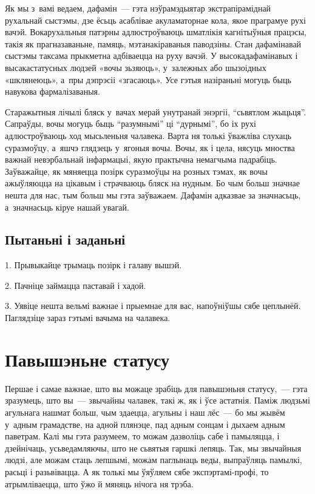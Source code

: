 Як мы з~вамі ведаем, дафамін~--- гэта нэўрамэдыятар экстрапіраміднай рухальнай сыстэмы, дзе ёсьць асаблівае акуламаторнае кола, якое праграмуе рухі вачэй. Вокарухальныя патэрны адлюстроўваюць шматлікія кагнітыўныя працэсы, такія як прагназаваньне, памяць, мэтанакіраваныя паводзіны. Стан дафамінавай сыстэмы таксама прыкметна адбіваецца на руху вачэй. У высокадафамінавых і высакастатусных людзей «вочы зьзяюць», у~залежных або шызоідных «шклянеюць», а~пры дэпрэсіі «згасаюць». Усе гэтыя назіраньні могуць быць навукова фармалізаваныя.

Старажытныя лічылі бляск у~вачах мерай унутранай энэргіі, ``сьвятлом жыцьця''. Сапраўды, вочы могуць быць ``разумнымі'' ці ``дурнымі'', бо іх рухі адлюстроўваюць ход мысьленьня чалавека. Варта ня толькі ўважліва слухаць суразмоўцу, а~яшчэ глядзець у~ягоныя вочы. Вочы, як і цела, нясуць мноства важнай невэрбальнай інфармацыі, якую практычна немагчыма падрабіць. Заўважайце, як мяняецца позірк суразмоўцы на розных тэмах, як вочы ажыўляюцца на цікавым і страчваюць бляск на нудным. Бо чым больш значнае нешта для нас, тым больш мы гэта заўважаем. Дафамін адказвае за значнасьць, а~значнасьць кіруе нашай увагай.

\subsection*{Пытаньні і заданьні}

1. Прывыкайце трымаць позірк і галаву вышэй.

2. Пачніце займацца паставай і хадой.

3. Уявіце нешта вельмі важнае і прыемнае для вас, напоўніўшы сябе цеплынёй. Паглядзіце зараз гэтымі вачыма на чалавека.


\section{Павышэньне статусу}

Першае і самае важнае, што вы можаце зрабіць для павышэньня статусу,~--- гэта зразумець, што вы~--- звычайны чалавек, такі ж, як і ўсе астатнія. Паміж людзьмі агульнага нашмат больш, чым здаецца, агульны і наш лёс~--- бо мы жывём у~адным грамадстве, на адной плянэце, пад адным сонцам і дыхаем адным паветрам. Калі мы гэта разумеем, то можам дазволіць сабе і памыляцца, і дзейнічаць, усьведамляючы, што не сьвятыя гаршкі лепяць. Так, мы звычайныя людзі, але можам стаць лепшымі, можам паглынаць веды, выпраўляць памылкі, расьці і разьвівацца. А як толькі мы ўяўляем сябе экспэртамі-профі, то атрымліваецца, што ўжо й мяняць нічога ня трэба.

